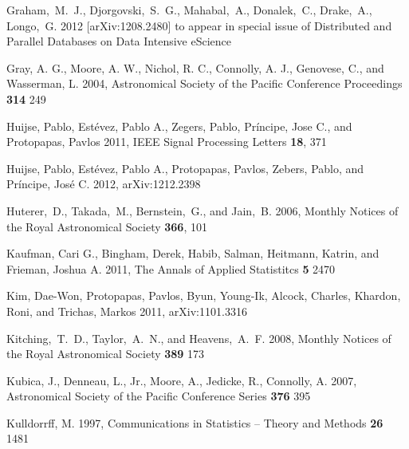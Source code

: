 \documentclass[prd,nofootbib,floatfix,11pt,tightenlines]{revtex4}
\begin{document}
\begin{thebibliography}{99}
Graham,~M.~J., Djorgovski,~S.~G., Mahabal,~A., Donalek,~C., Drake,~A.,
Longo,~G. 2012 [arXiv:1208.2480] to appear in special issue of Distributed and
Parallel Databases on Data Intensive eScience

Gray, A. G., Moore, A. W., Nichol, R. C., Connolly, A. J.,
Genovese, C., and Wasserman, L. 2004, Astronomical Society of the Pacific Conference
Proceedings {\bf 314} 249

Huijse, Pablo, Est\'evez, Pablo A., Zegers, Pablo, Pr\'incipe, Jose C.,
and Protopapas, Pavlos 2011, IEEE Signal Processing Letters {\bf 18}, 371

Huijse, Pablo, Est\'evez, Pablo A., Protopapas, Pavlos, Zebers, Pablo,
and Pr\'incipe, Jos\'e C. 2012, arXiv:1212.2398

Huterer,~D., Takada,~M., Bernstein,~G., and Jain,~B. 2006,
Monthly Notices of the Royal Astronomical Society {\bf 366}, 101

Kaufman, Cari G., Bingham, Derek, Habib, Salman, Heitmann, Katrin, and Frieman,
Joshua A. 2011, The Annals of Applied Statistitcs {\bf 5} 2470

Kim, Dae-Won, Protopapas, Pavlos, Byun, Young-Ik, Alcock, Charles, Khardon,
Roni, and Trichas, Markos 2011, arXiv:1101.3316

Kitching,~T.~D., Taylor,~A.~N., and Heavens,~A.~F. 2008,
Monthly Notices of the Royal Astronomical Society {\bf 389} 173

Kubica, J., Denneau, L., Jr., Moore, A., Jedicke, R., Connolly, A. 2007,
Astronomical Society of the Pacific Conference Series {\bf 376} 395

Kulldorrff, M. 1997,
Communications in Statistics -- Theory and Methods {\bf 26} 1481




\end{thebibliography}
\end{document}
